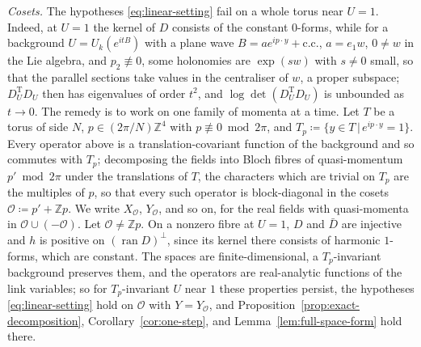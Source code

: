 \documentclass[11pt]{preprint}
\numberwithin{equation}{section}
\theoremstyle{definition}
\theoremstyle{remark}
\theoremstyle{plain}
\begin{document}
\emph{Cosets.} The hypotheses \eqref{eq:linear-setting} fail on a whole torus near $U = 1$. Indeed, at $U = 1$ the kernel of $D$ consists of the constant $0$-forms, while for a background $U = U_{k}(e^{itB})$ with a plane wave $B = a e^{ip\cdot y} + \mathrm{c.c.}$, $a = e_1w$, $0 \neq w$ in the Lie algebra, and $p_2 \not\equiv 0$, some holonomies are $\exp(sw)$ with $s \neq 0$ small, so that the parallel sections take values in the centraliser of $w$, a proper subspace; $D_U^{\mathrm T}D_U$ then has eigenvalues of order $t^2$, and $\log\det(D_U^{\mathrm T}D_U)$ is unbounded as $t \to 0$. The remedy is to work on one family of momenta at a time. Let $T$ be a torus of side $N$, $p \in (2\pi/N)\mathbb Z^4$ with $p \not\equiv 0 \bmod 2\pi$, and $T_p \coloneqq \{ y \in T \, | \, e^{ip\cdot y} = 1 \}$. Every operator above is a translation-covariant function of the background and so commutes with $T_p$; decomposing the fields into Bloch fibres of quasi-momentum $p' \bmod 2\pi$ under the translations of $T$, the characters which are trivial on $T_p$ are the multiples of $p$, so that every such operator is block-diagonal in the cosets $\mathcal O \coloneqq p' + \mathbb Zp$. We write $X_{\mathcal O}$, $Y_{\mathcal O}$, and so on, for the real fields with quasi-momenta in $\mathcal O \cup (-\mathcal O)$. Let $\mathcal O \neq \mathbb Zp$. On a nonzero fibre at $U = 1$, $D$ and $\bar D$ are injective and $h$ is positive on $(\operatorname{ran}D)^\perp$, since its kernel there consists of harmonic $1$-forms, which are constant. The spaces are finite-dimensional, a $T_p$-invariant background preserves them, and the operators are real-analytic functions of the link variables; so for $T_p$-invariant $U$ near $1$ these properties persist, the hypotheses \eqref{eq:linear-setting} hold on $\mathcal O$ with $Y = Y_{\mathcal O}$, and Proposition~\ref{prop:exact-decomposition}, Corollary~\ref{cor:one-step}, and Lemma~\ref{lem:full-space-form} hold there.
\end{document}
